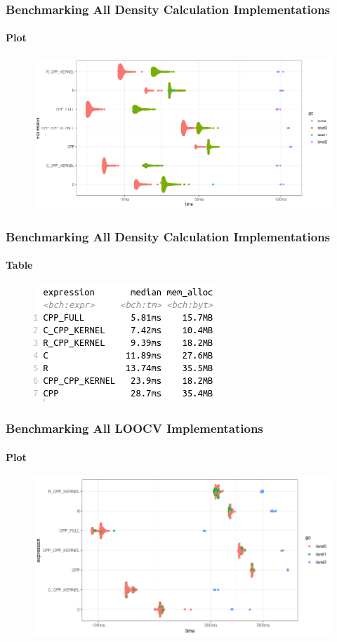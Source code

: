 \documentclass[aspectratio=169]{beamer}
\begin{document}
\begin{frame}
  \frametitle{Benchmarking All Density Calculation Implementations}
  \framesubtitle{Plot}
  \begin{figure}
    \centering
    \includegraphics[scale = 0.5]{figure/CVsRcppDensity.png}
  \end{figure}
\end{frame}
\begin{frame}
  \frametitle{Benchmarking All Density Calculation Implementations}
  \framesubtitle{Table}
  \begin{figure}
    \centering
    \includegraphics[scale = 0.7]{figure/CvsRCPPvsR_dens.png}
  \end{figure}
\end{frame}
\begin{frame}
  \frametitle{Benchmarking All LOOCV Implementations}
  \framesubtitle{Plot}
  \begin{figure}
    \centering
    \includegraphics[scale = 0.5]{figure/CVsRcpBandwidth.png}
  \end{figure}
\end{frame}
\end{document}
